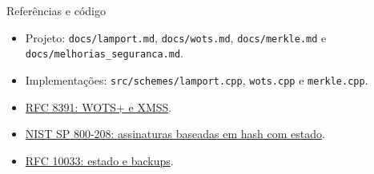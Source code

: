 \documentclass[aspectratio=169,11pt]{beamer}
\newcommand{\code}[1]{\texttt{#1}}
\begin{document}
\begin{frame}{Referências e código}
\begin{itemize}
\item Projeto: \code{docs/lamport.md}, \code{docs/wots.md}, \code{docs/merkle.md} e \code{docs/melhorias\_seguranca.md}.
\item Implementações: \code{src/schemes/lamport.cpp}, \code{wots.cpp} e \code{merkle.cpp}.
\item \href{https://www.rfc-editor.org/rfc/rfc8391.html}{RFC 8391: WOTS+ e XMSS}.
\item \href{https://csrc.nist.gov/pubs/sp/800/208/final}{NIST SP 800-208: assinaturas baseadas em hash com estado}.
\item \href{https://www.rfc-editor.org/rfc/rfc10033.html}{RFC 10033: estado e backups}.
\end{itemize}
\end{frame}
\end{document}
